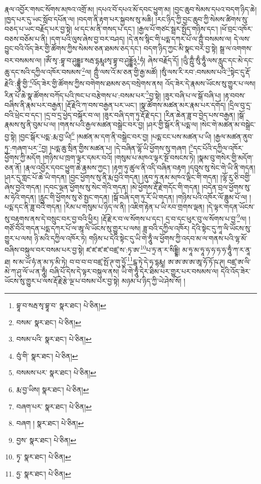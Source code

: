 རྣལ་འབྱོར་གསང་སོགས་མཁའ་འགྲོ་མ། །དཔའ་བོ་དཔའ་མོ་དབང་ཕྱུག་མ། །བྱང་ཆུབ་སེམས་དཔའ་བདག་ཉིད་ཆེ། །ཁྱད་པར་དུ་ཡང་སློབ་དཔོན་ལ། །བདག་ནི་རྟག་པར་སྐྱབས་སུ་མཆི། །རང་ཉིད་ཀྱི་བྱང་ཆུབ་ཀྱི་སེམས་ཚིགས་སུ་བཅད་པ་ཡང་བརྗོད་པར་བྱ་སྟེ། ཕ་དང་མ་ནི་གསད་པ་དང་། །རྒྱལ་པོ་གཙང་སྦྲར་སྤྱོད་གཉིས་དང་། །ཕོ་བྲང་འཁོར་བཅས་བཅོམ་པ་ནི། །དག་པའི་ལུས་ཞེས་བྱ་བར་བཤད། །དེ་ནས་སྙིང་གི་པདྨ་དཀར་པོ་ལ་ཀྵུྃ་བསམས་ལ། དེ་ལས་བྱུང་བའི་འོད་ཟེར་གྱི་ཚོགས་ཀྱིས་སེམས་ཅན་ཐམས་ཅད་དང་། བདག་ཉིད་ཀྱང་མི་སྣང་བར་བྱ་སྟེ། སྒྲ་ལ་འགགས་བར་བསམས་ལ། །ཨོཾ་སྭ་:བྷཱ་བ་ཤུདྡྷཿ་སརྦ་དྷརྨཱཿསྭ་བྷཱ་བ་ཤུདྡྷོ྅\footnote{བྷཱ་བ་སརྦ་སྭ་བྷཱ་བ་  སྣར་ཐང་།  པེ་ཅིན། }ཧཾ། ཞེས་བརྗོད་དོ། །ཡུྃ་ཀྵུྃ་སུྃ་ཧཱུྃ་ལས་རླུང་དང་མེ་དང་ཆུ་དང་སའི་དཀྱིལ་འཁོར་བསམས་\footnote{བསམ་  སྣར་ཐང་།  པེ་ཅིན། }ལ། ཀྵུྃ་ལས་འོ་མ་ཅན་གྱི་རྒྱ་མཚོ། །སུྃ་ལས་རི་རབ་:བསམས་པའི་\footnote{བསམ་པའི་  སྣར་ཐང་།  པེ་ཅིན། }སྟེང་དུ་རྡོ་རྗེའི་:བྷྲཱུྃ་གྱི་\footnote{བུཾ་གི་  སྣར་ཐང་།  པེ་ཅིན། }འོད་ཟེར་གྱི་ཚོགས་ཀྱིས་བགེགས་ཐམས་ཅད་བསྲེགས་ནས། འོད་ཟེར་དེ་རྣམས་ཡོངས་སུ་གྱུར་པ་ལས། རིན་པོ་ཆེ་སྣ་ཚོགས་བཀོད་པའི་ཁང་པ་བརྩེགས་པ་:བསམ་པར་\footnote{བསམས་པར་  སྣར་ཐང་།  པེ་ཅིན། }བྱ་སྟེ། །ཟུར་བཞི་པ་ལ་སྒོ་བཞི་པ། །རྟ་བབས་བཞིས་ནི་རྣམ་པར་བརྒྱན། །རྡོ་རྗེའི་ཀ་བས་བརྒྱན་པར་ཡང་། །སྣ་ཚོགས་མཚན་མར་རྣམ་པར་དགོད། །དྲིལ་བུ་དྲ་བའི་ཕྲེང་བ་དང་། །དྲ་བ་དྲ་ཕྱེད་བསྐོར་བ་ལ། །ཟུར་བཞི་དག་ཏུ་རྡོ་རྗེ་དང་། །རིན་ཆེན་ཟླ་བ་བྱེད་པས་བརྒྱན། །སྒོ་རྣམས་སུ་ནི་བུམ་པ་ལ། །གནས་པའི་རྒྱལ་མཚན་བསྒྲེང་བར་བྱ། །ཤར་གྱི་སྒོར་ནི་པདྨ་ལ། །སེང་གེ་མཚན་མ་བསྒྲེང་བྱ་སྟེ། །བྱང་སྒོར་པདྨ་:རྨ་བྱ་ཡི།\footnote{རྨ་བྱ་ཡིས།  སྣར་ཐང་།  པེ་ཅིན། } །མཚན་མ་དག་ནི་བསྒྲེང་བར་བྱ། །པདྨ་ངང་པས་མཚན་པ་ཡི། །རྒྱལ་མཚན་ནུབ་ཏུ་:གཞག་པར་\footnote{བཞག་པར་  སྣར་ཐང་།  པེ་ཅིན། }བྱ། །པདྨ་ཆུ་སྲིན་གྱིས་མཚན་པ། །དེ་བཞིན་ལྷོ་ཡི་ཕྱོགས་སུ་གཞག །\footnote{བཞག །  སྣར་ཐང་།  པེ་ཅིན། }དང་པོའི་དཀྱིལ་འཁོར་ཕྱོགས་ཀྱི་མདོག །གཉིས་པ་ཁྲག་ལྟར་དམར་བའོ། །གསུམ་པ་མཁའ་ལྟར་སྔོ་བསངས་ཏེ། །སྣམ་བུ་གསེར་གྱི་མདོག་ཅན་ནོ། །རྣལ་འབྱོར་དབང་ཕྱུག་ཆེ་རྣམས་ཀྱང་། །རྟག་ཏུ་ཚུལ་ནི་འདི་བཞིན་བརྟག །དབུས་སུ་སེང་གེ་ཡི་ནི་གདན། །ཤར་དུ་གླང་པོ་ཆེ་ཡི་གདན། །བྱང་ཕྱོགས་སུ་ནི་རྨ་བྱའི་གདན། །ནུབ་ཏུ་ནམ་མཁའ་ལྡིང་གི་གདན། །ལྷོ་རུ་ཅི་བགྱི་ཞེས་བྱའི་གདན། །དབང་ལྡན་ཕྱོགས་སུ་སེང་གེའི་གདན། །མེ་ཕྱོགས་རྡོ་རྗེ་གདོང་གི་གདན། །བདེན་བྲལ་ཕྱོགས་སུ་མ་ཧེའི་གདན། །རླུང་གི་ཕྱོགས་སུ་ཅེ་སྤྱང་གདན། །སྒོ་བཞི་དག་ཏུ་རོ་ཡི་གདན། །གཉིས་པའི་འཁོར་ལོ་ཟླུམ་པོ་ལ། །པདྨ་དང་ནི་ཟླ་བའི་གདན། །རིམ་པ་གསུམ་པ་ཉིད་ལ་ནི། །འཇིག་རྟེན་པ་ཡི་རབ་གྲགས་ལྡན། །དེ་ལྟར་གདན་ཡོངས་སུ་བརྟགས་ནས་དེ་བསྲུང་བར་བྱ་བའི་ཕྱིར། །རྡོ་རྗེ་ར་བ་ལ་སོགས་པ་དང་། དྲ་བ་དང་ཕུར་བུ་ལ་སོགས་པ་བྱ་\footnote{བྱས་  སྣར་ཐང་།  པེ་ཅིན། }ལ། །གཙོ་བོའི་གདན་པདྨ་དཀར་པོ་ལ་ཨཱ་ལི་ཡོངས་སུ་གྱུར་པ་ལས། ཟླ་བའི་དཀྱིལ་འཁོར། དེའི་སྟེང་དུ་ཀཱ་ལི་ཡོངས་སུ་གྱུར་པ་ལས། ཉི་མའི་དཀྱིལ་འཁོར་ཏེ། གཉིས་པ་དེའི་སྟེང་དུ་ཡི་གེ་ཧཱུྃ་ལ་ཕྱོགས་ཀྱི་འདབ་མ་ལ་གནས་པའི་ལྷ་མོ་བཞིས་བསྐུལ་བར་བསམ་པར་བྱ་སྟེ། ཛ་ཛ་ཛ་ཛ་བཛྲ་ས་:ཏྭ་ཨ་\footnote{ཏྭ་  སྣར་ཐང་།  པེ་ཅིན། }པ་ཏྲ་ན་ར་སིདྡྷི། མ་ཧཱ་མ་ཧཱ་ཧ་ཧ་ཧ་ཧ་ཧཱུྃ་ཀ་ར་ནཱ་ཐ། ས་མ་ཡོ་ཧཾ་ན་མ་ཏ་མི་ཏེ། བ་བ་བ་བ་བཛྲ་སྤོ་ཊ་གུ་ཧྱོ་\footnote{ཧྱ་  སྣར་ཐང་།  པེ་ཅིན། }ངྒ་ཏེ་དེ་ཧ་དྷརྨཱ། ཨ་ཨ་ཨ་ཨ་ཨཱ་ཧོ་ཏོ་ཥ་ཊ། བཛྲ་ཨ་ལི་མེ་ཀ་ཤུ་ལོ་ཡ་ན་ཧཱུྃ། བཞི་པོ་དེས་དེ་ལྟར་བསྐུལ་ནས། ཡི་གེ་ཧཱུྃ་དེར་ཐིམ་པར་གྱུར་པར་བསམས་ལ། དེའི་འོད་ཟེར་ཡོངས་སུ་གྱུར་པ་ལས་རྡོ་རྗེ་རྩེ་ལྔ་པ་བསམ་པར་བྱ་སྟེ། མཉམ་པ་ཉིད་ཀྱི་ཡེ་ཤེས་སོ། །
